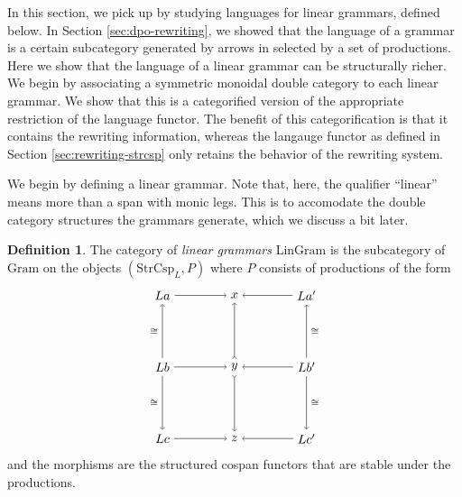 \documentclass{amsart}
\newcommand{\iso}{\cong}
\newcommand{\Gram}{\cat{Gram}}
\newcommand{\LinGram}{\cat{LinGram}}
\newcommand{\StrCsp}{\cat{StrCsp}}
\newcommand{\cat}[1]{\mathrm{#1}}
\theoremstyle{remark}
\theoremstyle{definition}
\newtheorem{definition}[theorem]{Definition}
\begin{document}
In this section, we pick up by studying languages for linear grammars,
defined below. In Section \ref{sec:dpo-rewriting}, we showed that the
language of a grammar is a certain subcategory generated by arrows in
selected by a set of productions. Here we show that the language of a
linear grammar can be structurally richer. We begin by associating a
symmetric monoidal double category to each linear grammar. We show
that this is a categorified version of the appropriate restriction of
the language functor. The benefit of this categorification is that it
contains the rewriting information, whereas the langauge functor as
defined in Section \ref{sec:rewriting-strcsp} only retains the
behavior of the rewriting system.

We begin by defining a linear grammar. Note that, here, the qualifier
``linear'' means more than a span with monic legs. This is to
accomodate the double category structures the grammars generate, which
we discuss a bit later.

\begin{definition} \label{def:linear-grammars}
  The category of \emph{linear grammars} $ \LinGram $ is
  the subcategory of $ \Gram $ on the objects
  $ ( \StrCsp_{L} , P ) $ where $ P $ consists of productions of
  the form
  \[
    \begin{tikzpicture}
      \begin{scope}
        \node (1) at (0,4) {\( La \)};
        \node (2) at (2,4) {\( x \)};
        \node (3) at (4,4) {\( La' \)};
        \node (4) at (0,2) {\( Lb \)};
        \node (5) at (2,2) {\( y \)};
        \node (6) at (4,2) {\( Lb' \)};
        \node (7) at (0,0) {\( Lc \)};
        \node (8) at (2,0) {\( z \)};
        \node (9) at (4,0) {\( Lc' \)};
        \draw [->] (1) to node []
          {\scriptsize{\( \)}} (2);
        \draw [->] (3) to node []
          {\scriptsize{\( \)}} (2);
        \draw [->] (4) to node []
          {\scriptsize{\( \)}} (5);
        \draw [->] (6) to node []
          {\scriptsize{\( \)}} (5);
        \draw [->] (7) to node []
          {\scriptsize{\( \)}} (8);
        \draw [->] (9) to node []
          {\scriptsize{\( \)}} (8);
        \draw [->] (4) to node [left]
          {\scriptsize{\( \iso \)}} (1);
        \draw [->] (4) to node [left]
          {\scriptsize{\( \iso \)}} (7);
        \draw [>->] (5) to node []
          {\scriptsize{\( \)}} (2);
        \draw [>->] (5) to node []
          {\scriptsize{\( \)}} (8);
        \draw [->] (6) to node [right]
          {\scriptsize{\( \iso \)}} (3);
        \draw [->] (6) to node [right]
          {\scriptsize{\( \iso \)}} (9);
      \end{scope}
    \end{tikzpicture}
  \]
  and the morphisms are the structured cospan functors that are stable
  under the productions.
\end{definition}
\end{document}
